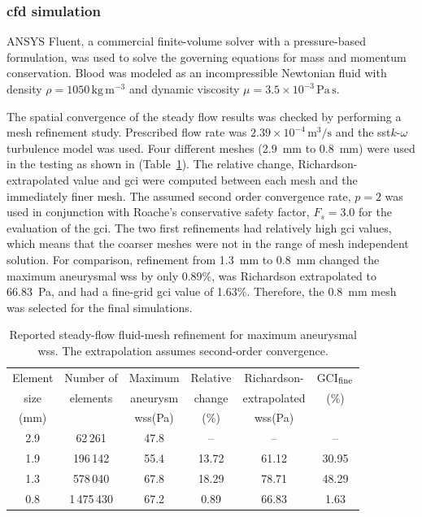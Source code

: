 \documentclass[12pt,a4paper]{article}
\newcommand{\WSS}{\ac{wss}\xspace}
\newcommand{\SST}{\ac{sst}\xspace}
\newcommand{\GCI}{\ac{gci}\xspace}
\newcommand{\CFDcap}{\Ac{cfd}\xspace}
\theoremstyle{definition}
\numberwithin{equation}{section}
\begin{document}
\subsubsection{\label{CFD Simulation}\texorpdfstring{\CFDcap}{CFD} simulation}ANSYS Fluent, a commercial finite-volume solver with a pressure-based formulation, was used to solve the governing equations for mass and momentum conservation. Blood was modeled as an incompressible Newtonian fluid with density \(\rho = 1050\,\mathrm{kg\,m^{-3}}\) and dynamic viscosity \(\mu = 3.5 \times 10^{-3}\,\mathrm{Pa\,s}\).


The spatial convergence of the steady flow results was checked by performing a mesh refinement study. Prescribed flow rate was \(2.39 \times 10^{-4} \, \mathrm{m^3/s}\) and the \SST \(k\)-\(\omega\) turbulence model was used. Four different meshes (2.9~mm to 0.8~mm) were used in the testing as shown in (Table~\ref{tab:mesh_study}). The relative change, Richardson-extrapolated value and \GCI were computed between each mesh and the immediately finer mesh. The assumed second order convergence rate, $p=2$ was used in conjunction with Roache's conservative safety factor, $F_s=3.0$ for the evaluation of the \GCI. The two first refinements had relatively high \GCI values, which means that the coarser meshes were not in the range of mesh independent solution. For comparison, refinement from 1.3~mm to 0.8~mm changed the maximum aneurysmal \WSS by only 0.89\%, was Richardson extrapolated to 66.83~Pa, and had a fine-grid \GCI value of 1.63\%. Therefore, the 0.8~mm mesh was selected for the final simulations.

\begin{table}[ht!]
\centering
\setlength{\tabcolsep}{3.5pt}
\caption{Reported steady-flow fluid-mesh refinement for maximum aneurysmal \WSS. The extrapolation assumes second-order convergence.}
\label{tab:mesh_study}
\setlength{\tabcolsep}{7pt}
\begin{tabular}{cccccc}
\toprule
Element & Number of & Maximum & Relative & Richardson- & GCI$_{\rm fine}$ \\
size & elements & aneurysm & change & extrapolated & (\%) \\
(mm) & & \WSS (Pa) & (\%) & \WSS (Pa) & \\
\midrule
2.9 & 62\,261    & 47.8 & --    & --    & -- \\
1.9 & 196\,142   & 55.4 & 13.72 & 61.12 & 30.95 \\
1.3 & 578\,040   & 67.8 & 18.29 & 78.71 & 48.29 \\
0.8 & 1\,475\,430 & 67.2 & 0.89  & 66.83 & 1.63 \\
\bottomrule
\end{tabular}
\end{table}
\end{document}
